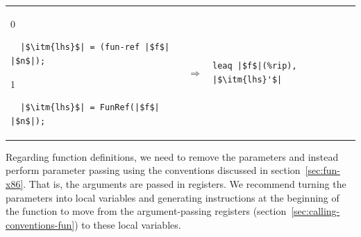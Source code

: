 \documentclass[7x10]{TimesAPriori_MIT}%
\def\racketEd{0}
\def\pythonEd{1}
\providecommand{\BookEdition}{1}
\let\edition\BookEdition
\newcommand{\pythonColor}[0]{}
\numberwithin{theorem}{chapter}
\numberwithin{definition}{chapter}
\numberwithin{equation}{chapter}
\begin{document}
\begin{center}
  \begin{tabular}{lcl}
\begin{minipage}{0.35\textwidth}
{\if\edition\racketEd
\begin{lstlisting}
  |$\itm{lhs}$| = (fun-ref |$f$| |$n$|);
\end{lstlisting}
\fi}
{\if\edition\pythonEd\pythonColor
\begin{lstlisting}
  |$\itm{lhs}$| = FunRef(|$f$| |$n$|);
\end{lstlisting}
\fi}
\end{minipage}
&
$\Rightarrow$\qquad\qquad
&
\begin{minipage}{0.3\textwidth}
\begin{lstlisting}
leaq |$f$|(%rip), |$\itm{lhs}'$|
\end{lstlisting}
\end{minipage}
  \end{tabular}
\end{center}


Regarding function definitions, we need to remove the parameters and
instead perform parameter passing using the conventions discussed in
section~\ref{sec:fun-x86}. That is, the arguments are passed in
registers. We recommend turning the parameters into local variables
and generating instructions at the beginning of the function to move
from the argument-passing registers
(section~\ref{sec:calling-conventions-fun}) to these local variables.
\end{document}
